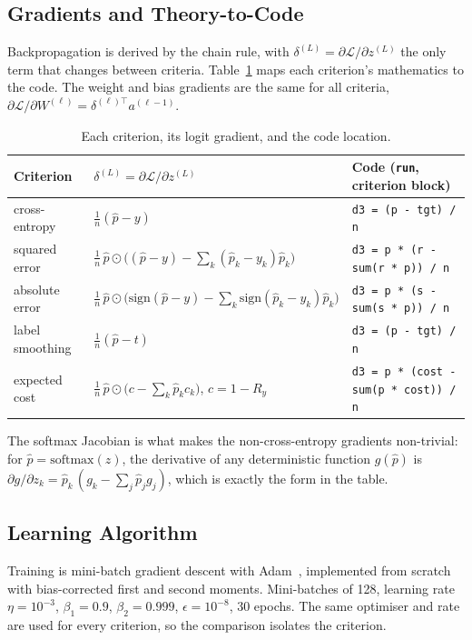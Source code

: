 \documentclass[11pt]{article}
\newcommand{\Lc}{\mathcal{L}}
\begin{document}
\subsection{Gradients and Theory-to-Code}
\label{sec:theory}

Backpropagation is derived by the chain rule, with $\delta^{(L)}=\partial\Lc/\partial z^{(L)}$
the only term that changes between criteria. Table~\ref{tab:map} maps each criterion's
mathematics to the code. The weight and bias gradients are the same for all criteria,
$\partial\Lc/\partial W^{(\ell)}=\delta^{(\ell)\top}a^{(\ell-1)}$.

\begin{table}[htbp]
\centering
\small
\caption{Each criterion, its logit gradient, and the code location.}
\label{tab:map}
\begin{tabular}{@{}p{3.5cm}p{5.4cm}p{5.2cm}@{}}
\toprule
Criterion & $\delta^{(L)}=\partial\Lc/\partial z^{(L)}$ & Code (\texttt{run}, criterion block) \\
\midrule
cross-entropy & $\frac1n(\hat p-y)$ & \texttt{d3 = (p - tgt) / n} \\
squared error & $\frac1n\,\hat p\odot\big((\hat p-y)-\sum_k(\hat p_k-y_k)\hat p_k\big)$ & \texttt{d3 = p * (r - sum(r * p)) / n} \\
absolute error & $\frac1n\,\hat p\odot\big(\mathrm{sign}(\hat p-y)-\sum_k \mathrm{sign}(\hat p_k-y_k)\hat p_k\big)$ & \texttt{d3 = p * (s - sum(s * p)) / n} \\
label smoothing & $\frac1n(\hat p-t)$ & \texttt{d3 = (p - tgt) / n} \\
expected cost & $\frac1n\,\hat p\odot\big(c-\sum_k \hat p_k c_k\big)$, $c=1-R_y$ & \texttt{d3 = p * (cost - sum(p * cost)) / n} \\
\bottomrule
\end{tabular}
\end{table}

The softmax Jacobian is what makes the non-cross-entropy gradients non-trivial: for
$\hat p=\mathrm{softmax}(z)$, the derivative of any deterministic function $g(\hat p)$ is
$\partial g/\partial z_k=\hat p_k\,(g_k-\sum_j \hat p_j g_j)$, which is exactly the form in the
table.

\subsection{Learning Algorithm}

Training is mini-batch gradient descent with Adam~\parencite{kingma2015}, implemented from scratch
with bias-corrected first and second moments. Mini-batches of 128, learning rate
$\eta=10^{-3}$, $\beta_1=0.9$, $\beta_2=0.999$, $\epsilon=10^{-8}$, 30 epochs. The same
optimiser and rate are used for every criterion, so the comparison isolates the criterion.
\end{document}
